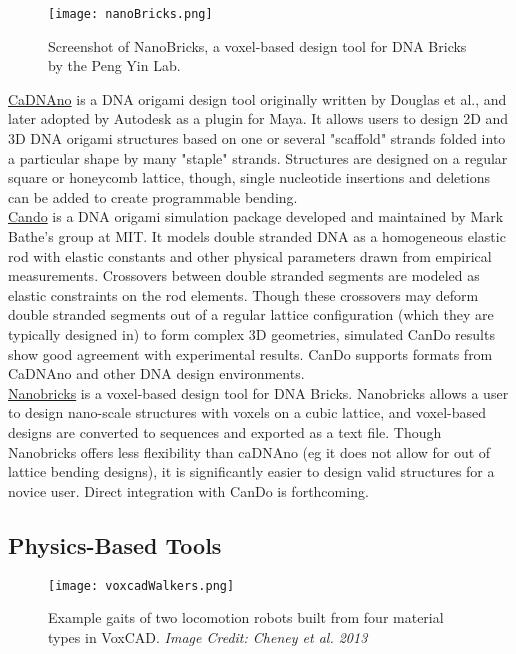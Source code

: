 {\begin{figure}
  \texttt{[image: nanoBricks.png]}
  \caption{Screenshot of NanoBricks, a voxel-based design tool for DNA Bricks by the Peng Yin Lab.}
  \label{fig:nanoBricks}
\end{figure}

\href{http://cadnano.org/}{CaDNAno} is a DNA origami design tool originally written by Douglas et al.\cite{Douglas2009}, and later adopted by Autodesk as a plugin for Maya.  It allows users to design 2D and 3D DNA origami structures based on one or several "scaffold" strands folded into a particular shape by many "staple" strands.  Structures are designed on a regular square or honeycomb lattice, though, single nucleotide insertions and deletions can be added to create programmable bending\cite{Dietz2009}\cite{Kim2012}.\\

\href{http://cando-dna-origami.org/}{Cando} is a DNA origami simulation package developed and maintained by Mark Bathe's group at MIT.  It models double stranded DNA as a homogeneous elastic rod with elastic constants and other physical parameters drawn from empirical measurements\cite{Peters2014}.  Crossovers between double stranded segments are modeled as elastic constraints on the rod elements.  Though these crossovers may deform double stranded segments out of a regular lattice configuration (which they are typically designed in) to form complex 3D geometries, simulated CanDo results show good agreement with experimental results\cite{Kim2012a}.  CanDo supports formats from CaDNAno and other DNA design environments.
\\

\href{http://yin.hms.harvard.edu/bricks/try/}{Nanobricks} is a voxel-based design tool for DNA Bricks.  Nanobricks allows a user to design nano-scale structures with voxels on a cubic lattice, and voxel-based designs are converted to sequences and exported as a text file.  Though Nanobricks offers less flexibility than caDNAno (eg it does not allow for out of lattice bending designs), it is significantly easier to design valid structures for a novice user.  Direct integration with CanDo is forthcoming.
\\

\subsection{Physics-Based Tools}

\begin{figure}
  \texttt{[image: voxcadWalkers.png]}
  \caption{Example gaits of two locomotion robots built from four material types in VoxCAD\cite{Cheney2013b}.  \textit{Image Credit: Cheney et al. 2013}}
  \label{fig:voxcadWalkers}
\end{figure}

}
